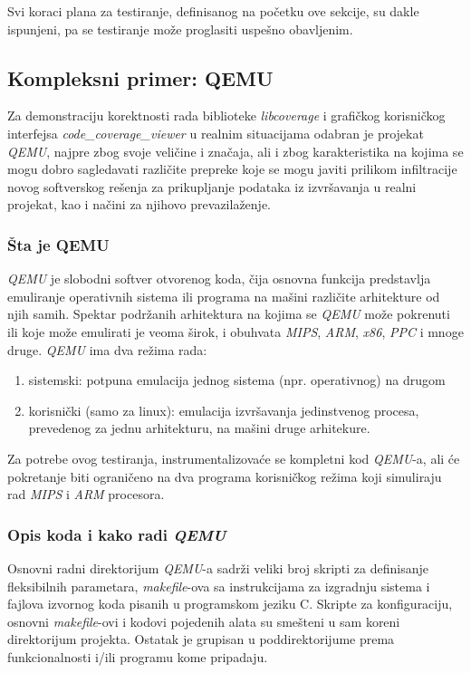 \documentclass[12pt,oneside]{memoir}
\newcommand{\strano}[1]{\textit{#1}}
\begin{document}
Svi koraci plana za testiranje, definisanog na početku ove sekcije, su dakle ispunjeni, pa se testiranje može proglasiti uspešno obavljenim. 


\subsection{Kompleksni primer: QEMU}

Za demonstraciju korektnosti rada biblioteke \strano{libcoverage} i grafičkog korisničkog interfejsa \strano{code\_coverage\_viewer} u realnim situacijama odabran je projekat \strano{QEMU}, najpre zbog svoje veličine i značaja, ali i zbog karakteristika na kojima se mogu dobro sagledavati različite prepreke koje se mogu javiti prilikom infiltracije novog softverskog rešenja za prikupljanje podataka iz izvršavanja u realni projekat, kao i načini za njihovo prevazilaženje.

\subsubsection{Šta je QEMU}

\strano{QEMU} je slobodni softver otvorenog koda, čija osnovna funkcija predstavlja emuliranje operativnih sistema ili programa na mašini različite arhitekture od njih samih. Spektar podržanih arhitektura na kojima se \strano{QEMU} može pokrenuti ili koje može emulirati je veoma širok, i obuhvata \strano{MIPS}, \strano{ARM}, \strano{x86}, \strano{PPC} i mnoge druge.
\strano{QEMU} ima dva režima rada:
\begin{enumerate}
\item sistemski: potpuna emulacija jednog sistema (npr. operativnog) na drugom
\item korisnički (samo za linux): emulacija izvršavanja jedinstvenog procesa, prevedenog za jednu arhitekturu, na mašini druge arhitekure.
\end{enumerate}
Za potrebe ovog testiranja, instrumentalizovaće se kompletni kod \strano{QEMU}-a, ali će pokretanje biti ograničeno na dva programa korisničkog režima koji simuliraju rad \strano{MIPS} i \strano{ARM} procesora.

\subsubsection{Opis koda i kako radi \strano{QEMU}}

Osnovni radni direktorijum \strano{QEMU}-a sadrži veliki broj skripti za definisanje fleksibilnih parametara, \strano{makefile}-ova sa instrukcijama za izgradnju sistema i fajlova izvornog koda pisanih u programskom jeziku C. Skripte za konfiguraciju, osnovni \strano{makefile}-ovi i kodovi pojedenih alata su smešteni u sam koreni direktorijum projekta. Ostatak je grupisan u poddirektorijume prema funkcionalnosti i/ili programu kome pripadaju.
\end{document}
